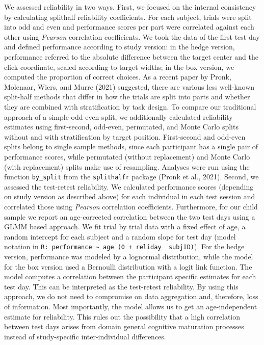 \documentclass[
  man,floatsintext]{apa6}
\begin{document}
We assessed reliability in two ways.
First, we focused on the internal consistency by calculating splithalf reliability coefficients. For each subject, trials were split into odd and even and performance scores per part were correlated against each other using \emph{Pearson} correlation coefficients. We took the data of the first test day and defined performance according to study version: in the hedge version, performance referred to the absolute difference between the target center and the click coordinate, scaled according to target widths; in the box version, we computed the proportion of correct choices.
As a recent paper by Pronk, Molenaar, Wiers, and Murre (2021) suggested, there are various less well-known split-half methods that differ in how the trials are split into parts and whether they are combined with stratification by task design. To compare our traditional approach of a simple odd-even split, we additionally calculated reliability estimates using first-second, odd-even, permutated, and Monte Carlo splits without and with stratification by target position. First-second and odd-even splits belong to single sample methods, since each participant has a single pair of performance scores, while permutated (without replacement) and Monte Carlo (with replacement) splits make use of resampling. Analyses were run using the function \texttt{by\_split} from the \texttt{splithalfr} package (Pronk et al., 2021).
Second, we assessed the test-retest reliability. We calculated performance scores (depending on study version as described above) for each individual in each test session and correlated those using \emph{Pearson} correlation coefficients. Furthermore, for our child sample we report an age-corrected correlation between the two test days using a GLMM based approach. We fit trial by trial data with a fixed effect of age, a random intercept for each subject and a random slope for test day (model notation in \texttt{R:\ performance\ \textasciitilde{}\ age\ (0\ +\ reliday\ \textbar{}\ subjID)}). For the hedge version, performance was modeled by a lognormal distribution, while the model for the box version used a Bernoulli distribution with a logit link function.
The model computes a correlation between the participant specific estimates for each test day. This can be interpreted as the test-retest reliability. By using this approach, we do not need to compromise on data aggregation and, therefore, loss of information. Most importantly, the model allows us to get an age-independent estimate for reliability. This rules out the possibility that a high correlation between test days arises from domain general cognitive maturation processes instead of study-specific inter-individual differences.
\end{document}
